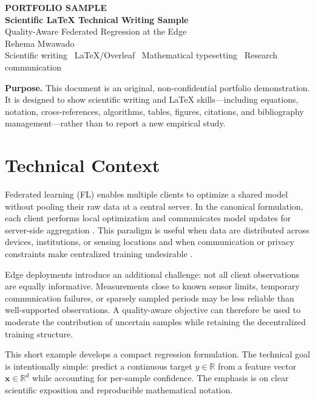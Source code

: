 \documentclass[10pt]{article}
\newcommand{\R}{\mathbb{R}}
\begin{document}
\begin{center}
{\small\bfseries\color{accent} PORTFOLIO SAMPLE}\\[5pt]
{\LARGE\bfseries Scientific LaTeX Technical Writing Sample}\\[7pt]
{\large Quality-Aware Federated Regression at the Edge}\\[8pt]
{\normalsize Rehema Mwawado}\\[3pt]
{\small Scientific writing \textbullet\ LaTeX/Overleaf \textbullet\ Mathematical typesetting \textbullet\ Research communication}
\end{center}

\vspace{5pt}
\noindent\colorbox{soft}{\parbox{0.965\linewidth}{\small
\textbf{Purpose.} This document is an original, non-confidential portfolio demonstration. It is designed to show scientific writing and LaTeX skills---including equations, notation, cross-references, algorithms, tables, figures, citations, and bibliography management---rather than to report a new empirical study.
}}

\section{Technical Context}

Federated learning (FL) enables multiple clients to optimize a shared model without pooling their raw data at a central server. In the canonical formulation, each client performs local optimization and communicates model updates for server-side aggregation \citep{mcmahan2017communication}. This paradigm is useful when data are distributed across devices, institutions, or sensing locations and when communication or privacy constraints make centralized training undesirable \citep{kairouz2021advances}.

Edge deployments introduce an additional challenge: not all client observations are equally informative. Measurements close to known sensor limits, temporary communication failures, or sparsely sampled periods may be less reliable than well-supported observations. A quality-aware objective can therefore be used to moderate the contribution of uncertain samples while retaining the decentralized training structure.

This short example develops a compact regression formulation. The technical goal is intentionally simple: predict a continuous target $y\in\R$ from a feature vector $\mathbf{x}\in\R^d$ while accounting for per-sample confidence. The emphasis is on clear scientific exposition and reproducible mathematical notation.
\end{document}
